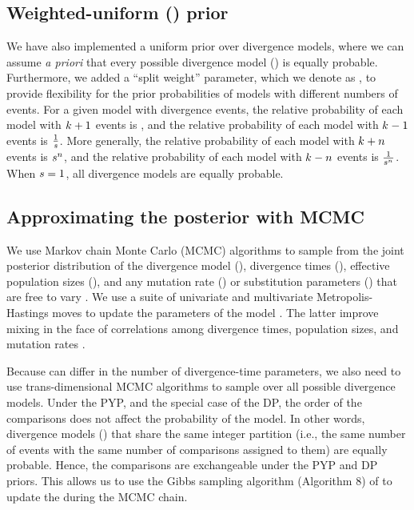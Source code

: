 \subsection{Weighted-uniform (\wunif) prior}
We have also implemented a uniform prior over divergence models, where we can
assume \emph{a priori} that every possible divergence model (\etimesets) is
equally probable.
Furthermore, we added a ``split weight'' parameter, which we denote as
\splitweight, to provide flexibility for the prior probabilities of
models with different numbers of events.
For a given model with \nevents divergence events, the relative probability
of each model with $k_{} + 1$ events is \splitweight,
and the relative probability of each model with $k_{} - 1$ events is
$\frac{1}{s}$.
More generally, the relative probability of each model with
$k_{} + n$
events is
$s{}^n$,
and the relative probability of each model with
$k_{} - n$
events is
$\frac{1}{s{}^n}$.
When $s = 1$, all divergence models are equally probable.

\subsection{Approximating the posterior with MCMC}

We use Markov chain Monte Carlo (MCMC) algorithms to sample from the joint
posterior distribution of the divergence model (\etimesets), divergence times
(\etimes), effective population sizes (\epopsize), and any mutation rate
(\murate) or substitution parameters (\gfreq) that are free to vary
\cite{Oaks2018ecoevolity,Oaks2019codemog}.
We use a suite of univariate and multivariate Metropolis-Hastings moves to
update the parameters of the model \citep{Metropolis1953,Hastings1970}.
The latter improve mixing in the face of correlations among divergence times,
population sizes, and mutation rates \citep[see][]{Oaks2018ecoevolity}.

Because \etimesets can differ in the number of divergence-time parameters, we
also need to use trans-dimensional MCMC algorithms to sample over all possible
divergence models.
Under the PYP, and the special case of the DP, the order of the comparisons
does not affect the probability of the model.
In other words, divergence models (\etimesets) that share the same integer
partition (i.e., the same number of events with the same number of comparisons
assigned to them) are equally probable.
Hence, the comparisons are exchangeable under the PYP and DP priors.
This allows us to use the Gibbs sampling algorithm (Algorithm 8) of
\citet{Neal2000} to update the \etimesets during the MCMC chain.

